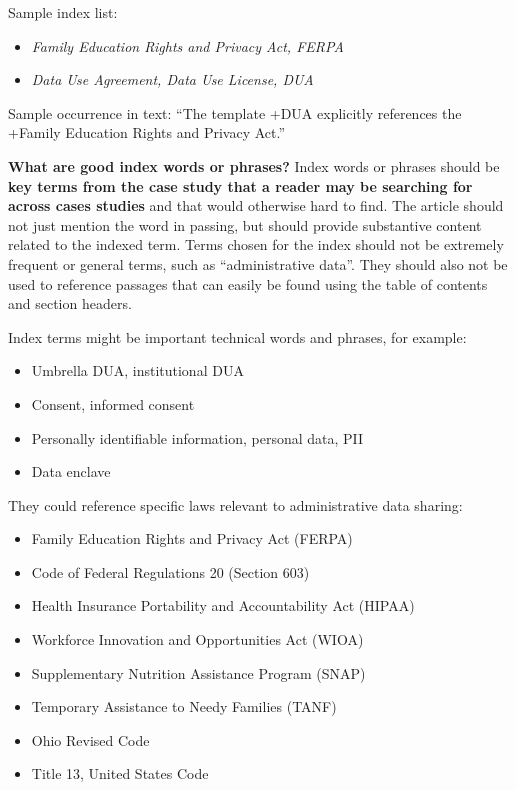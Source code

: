 \documentclass[
]{book}
\providecommand{\tightlist}{%
  \setlength{\itemsep}{0pt}\setlength{\parskip}{0pt}}
\begin{document}
Sample index list:

\begin{itemize}
\tightlist
\item
  \emph{Family Education Rights and Privacy Act, FERPA}
\item
  \emph{Data Use Agreement, Data Use License, DUA}
\end{itemize}

Sample occurrence in text: ``The template +DUA\textbar{} explicitly references the +Family Education Rights and Privacy Act\textbar.''

\textbf{What are good index words or phrases?} Index words or phrases should be \textbf{key terms from the case study that a reader may be searching for across cases studies} and that would otherwise hard to find. The article should not just mention the word in passing, but should provide substantive content related to the indexed term. Terms chosen for the index should not be extremely frequent or general terms, such as ``administrative data''. They should also not be used to reference passages that can easily be found using the table of contents and section headers.

Index terms might be important technical words and phrases, for example:

\begin{itemize}
\tightlist
\item
  Umbrella DUA, institutional DUA
\item
  Consent, informed consent
\item
  Personally identifiable information, personal data, PII
\item
  Data enclave
\end{itemize}

They could reference specific laws relevant to administrative data sharing:

\begin{itemize}
\tightlist
\item
  Family Education Rights and Privacy Act (FERPA)
\item
  Code of Federal Regulations 20 (Section 603)
\item
  Health Insurance Portability and Accountability Act (HIPAA)
\item
  Workforce Innovation and Opportunities Act (WIOA)
\item
  Supplementary Nutrition Assistance Program (SNAP)
\item
  Temporary Assistance to Needy Families (TANF)
\item
  Ohio Revised Code
\item
  Title 13, United States Code
\end{itemize}
\end{document}
